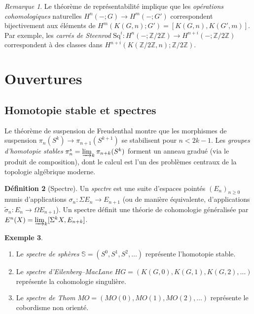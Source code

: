 \documentclass[12pt,a4paper,openany]{book}
\theoremstyle{definition}
\newtheorem{definition}{Définition}[chapter]
\newtheorem{exemple}[definition]{Exemple}
\theoremstyle{plain}
\theoremstyle{remark}
\newtheorem{remarque}[definition]{Remarque}
\newcommand{\Z}{\mathbb{Z}}
\begin{document}
\begin{remarque}\label{rem:operations-cohomologiques}
  Le théorème de représentabilité implique que les \emph{opérations cohomologiques}
  naturelles $H^n(-; G) \to H^m(-; G')$ correspondent bijectivement aux éléments de
  $H^m(K(G,n); G') = [K(G,n), K(G',m)]$. Par exemple, les \emph{carrés de
  Steenrod} $\mathrm{Sq}^i \colon H^n(-; \Z/2\Z) \to
  H^{n+i}(-; \Z/2\Z)$ correspondent à des classes dans
  $H^{n+i}(K(\Z/2\Z, n); \Z/2\Z)$.
\end{remarque}

\section{Ouvertures}\label{sec:ouvertures}

\subsection{Homotopie stable et spectres}\label{subsec:homotopie-stable}

Le théorème de suspension de Freudenthal montre que les morphismes de suspension
$\pi_n(S^k) \to \pi_{n+1}(S^{k+1})$ se stabilisent pour $n < 2k - 1$.
Les \emph{groupes d'homotopie stables} $\pi_n^s = \varinjlim_k \pi_{n+k}(S^k)$
forment un anneau gradué (via le produit de composition), dont le calcul est l'un
des problèmes centraux de la topologie algébrique moderne.

\begin{definition}[Spectre]\label{def:spectre}
  Un \emph{spectre} est une suite d'espaces pointés $(E_n)_{n \geq 0}$ munis
  d'applications $\sigma_n \colon \Sigma E_n \to E_{n+1}$ (ou de manière
  équivalente, d'applications $\tilde{\sigma}_n \colon E_n \to \Omega E_{n+1}$).
  Un spectre définit une théorie de cohomologie généralisée par
  $E^n(X) = \varinjlim_k [\Sigma^k X, E_{n+k}]$.
\end{definition}

\begin{exemple}\label{ex:spectres}
  \begin{enumerate}[label=(\roman*)]
    \item Le \emph{spectre de sphères}
          $\mathbb{S} = (S^0, S^1, S^2, \ldots)$ représente l'homotopie stable.
    \item Le \emph{spectre d'Eilenberg--MacLane}
          $HG = (K(G,0), K(G,1), K(G,2), \ldots)$ représente la cohomologie singulière.
    \item Le \emph{spectre de Thom}
          $MO = (MO(0), MO(1), MO(2), \ldots)$ représente le cobordisme non orienté.
  \end{enumerate}
\end{exemple}
\end{document}
